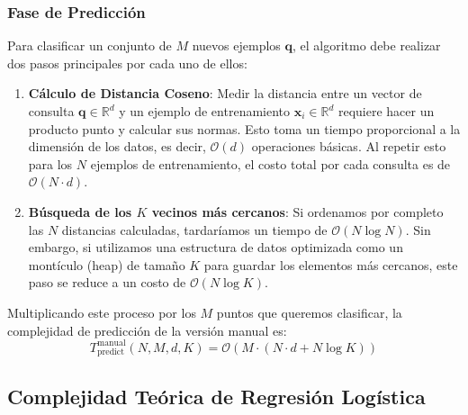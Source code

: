 \documentclass[twocolumn,10pt,journal]{IEEEtran}
\begin{document}
\begin{table}[t]
\subsubsection{Fase de Predicción}
Para clasificar un conjunto de $M$ nuevos ejemplos $\mathbf{q}$, el algoritmo debe realizar dos pasos principales por cada uno de ellos:
\begin{enumerate}
\item \textbf{Cálculo de Distancia Coseno}: Medir la distancia entre un vector de consulta $\mathbf{q} \in \mathbb{R}^d$ y un ejemplo de entrenamiento $\mathbf{x}_i \in \mathbb{R}^d$ requiere hacer un producto punto y calcular sus normas. Esto toma un tiempo proporcional a la dimensión de los datos, es decir, $\mathcal{O}(d)$ operaciones básicas. Al repetir esto para los $N$ ejemplos de entrenamiento, el costo total por cada consulta es de $\mathcal{O}(N \cdot d)$.
\item \textbf{Búsqueda de los $K$ vecinos más cercanos}: Si ordenamos por completo las $N$ distancias calculadas, tardaríamos un tiempo de $\mathcal{O}(N \log N)$. Sin embargo, si utilizamos una estructura de datos optimizada como un montículo (heap) de tamaño $K$ para guardar los elementos más cercanos, este paso se reduce a un costo de $\mathcal{O}(N \log K)$.
\end{enumerate}
Multiplicando este proceso por los $M$ puntos que queremos clasificar, la complejidad de predicción de la versión manual es:
\begin{equation}
T_{\text{predict}}^{\text{manual}}(N, M, d, K) = \mathcal{O}(M \cdot (N \cdot d + N \log K))
\end{equation}

\subsection{Complejidad Teórica de Regresión Logística}


\end{table}
\end{document}
